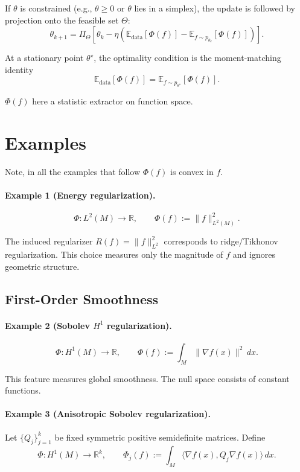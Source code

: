 If $\theta$ is constrained (e.g., $\theta \ge 0$ or $\theta$ lies in a simplex), the update is followed by projection onto the feasible set $\Theta$:
\[
	\theta_{k+1}
	=
	\Pi_\Theta
	\left[
		\theta_k
		-
		\eta
		\left(
		\mathbb E_{\mathrm{data}}\!\left[\Phi(f)\right]
		-
		\mathbb E_{f \sim p_{\theta_k}}\!\left[\Phi(f)\right]
		\right)
		\right].
\]

At a stationary point $\theta^\star$, the optimality condition is the moment-matching identity
\[
	\mathbb E_{\mathrm{data}}\!\left[\Phi(f)\right]
	=
	\mathbb E_{f \sim p_{\theta^\star}}\!\left[\Phi(f)\right].
\]

$\Phi(f)$ here a statistic extractor on function space.

\section{Examples}

Note, in all the examples that follow $\Phi(f)$ is convex in $f$.
\paragraph{Example 1 (Energy regularization).}
\[
	\Phi : L^2(M) \to \mathbb{R},
	\qquad
	\Phi(f) := \|f\|_{L^2(M)}^2.
\]

The induced regularizer $R(f)=\|f\|_{L^2}^2$ corresponds to ridge/Tikhonov regularization.
This choice measures only the magnitude of $f$ and ignores geometric structure.


\subsection{First-Order Smoothness}

\paragraph{Example 2 (Sobolev $H^1$ regularization).}
\[
	\Phi : H^1(M) \to \mathbb{R},
	\qquad
	\Phi(f) := \int_M \|\nabla f(x)\|^2 \, dx.
\]

This feature measures global smoothness.
The null space consists of constant functions.


\paragraph{Example 3 (Anisotropic Sobolev regularization).}
Let $\{Q_j\}_{j=1}^k$ be fixed symmetric positive semidefinite matrices.
Define
\[
	\Phi : H^1(M) \to \mathbb{R}^k,
	\qquad
	\Phi_j(f) := \int_M \langle \nabla f(x), Q_j \nabla f(x)\rangle \, dx.
\]

